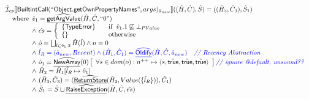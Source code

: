 \documentclass{article}
\newcommand{\SF}[1]{\mbox{\textsf{#1}}}
\newcommand{\comment}[1]{\textit{#1}}
\newcommand{\wherec}[1]{{\rm where}\begin{array}[t]{l}#1\end{array}}
\newcommand{\ifc}[1]{{\rm if}\begin{array}[t]{l}#1\end{array}}
\newcommand{\owc}{{\rm otherwise}}
\newcommand{\aI}{\hat{\mathcal{I}}}
\newcommand{\lbr}{\llbracket}
\newcommand{\rbr}{\rrbracket}
\newcommand{\ahf}[1]{\widehat{\underline{\sf #1}}}
\newcommand{\atrue}{\hat{\SF{true}}}
\def\inblue{\color{blue}}
\def\inblue{\color{blue}}
\begin{document}
\[\begin{array}{l}
\aI _{cp}\lbr \SF{BuiltintCall}(``\SF{Object.getOwnPropertyNames}",args)_{\hat{a}_{new}}\rbr((\hat{H},\hat{C}), \hat{S})
  = ((\hat{H}_3, \hat{C}_3), \hat{S}_1)\\
\quad\wherec{
  \hat{v}_1 =\ahf{getArgValue}(\hat{H}, \hat{C}, ``0")\\
  \land\ \hat{es} =
    \left\{
    \begin{array}{l@{\quad\quad}l}
      \{ \SF{TypeError} \} & \ifc{\hat{v}_1.1 \not\sqsubseteq \bot_{PValue}}\\
      \{ \}& \owc\\
    \end{array}
    \right.\\
  \land\ \hat{o} = \bigsqcup_{\hat{l} \in \hat{v}_1.2 } \hat{H}(\hat{l}) \land n = 0\\
  \land\ \inblue\hat{l}_{R} = (\hat{a}_{new}, Recent)
  \land \inblue (\hat{H}_1, \hat{C}_1) = \ahf{Oldify}(\hat{H}, \hat{C}, \hat{a}_{new})
     \quad\comment{{\inblue // Recency Abstraction}}\\
  \land\ \hat{o}_1 = \ahf{NewArray}(0)\left[
    \begin{array}{l}
      \forall s \in dom(o): n^{++} \mapsto \langle s, \atrue, \atrue, \atrue \rangle
    \end{array}\right] \comment{{\inblue // ignore @default, unsound??}}\\
  \land\ \hat{H}_2 = \hat{H}_1[\hat{l}_{R} \mapsto \hat{o}_1]\\
  \land\ (\hat{H}_3, \hat{C}_3) = 
      (\ahf{ReturnStore}(\hat{H}_2, Value(\{\hat{l}_R\})), \hat{C}_1)\\
  \land\ \hat{S}_1 = \hat{S} \sqcup \ahf{RaiseException}(\hat{H}, \hat{C}, \hat{es})\\
  }\\
\\\\ 

\end{array}
\]
\end{document}
